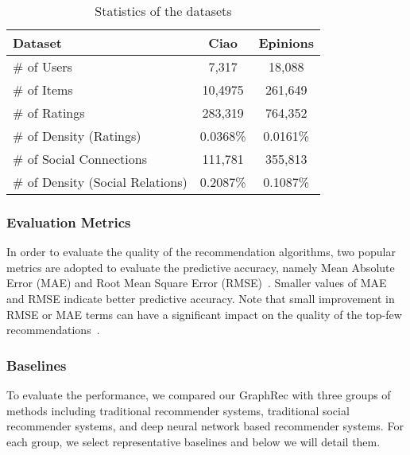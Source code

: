 \documentclass[sigconf]{acmart} \copyrightyear{2019}
\begin{document}
\begin{table}[htbp]
\centering
\caption{Statistics of the datasets}
\label{tab:dataset}
\begin{tabular}{l|c|c}
\hline
Dataset               & Ciao  &Epinions \\ \hline
\# of Users           & 7,317   &18,088 \\ \hline
\# of Items           & 10,4975  &261,649 \\ \hline
\# of Ratings          & 283,319  &764,352\\ \hline \# of Density (Ratings)          & 0.0368\% &0.0161\%  \\ \hline \hline
\# of Social Connections & 111,781 &355,813 \\ \hline
\# of Density (Social Relations)  & 0.2087\% &0.1087\% \\ \hline \end{tabular}
\vskip -0.1in
\end{table}


\subsubsection{Evaluation Metrics}
In order to evaluate the quality of the recommendation algorithms, two popular metrics are adopted to evaluate the predictive accuracy, namely Mean Absolute Error (MAE) and Root Mean Square Error (RMSE)~\cite{wang2018exploring}. Smaller values of MAE and RMSE indicate better predictive accuracy. Note that small improvement in RMSE or MAE terms can have a significant impact on the quality of the top-few recommendations~\cite{koren2008factorization}.

\subsubsection{Baselines}

To evaluate the performance, we compared our GraphRec with three groups of methods including traditional recommender systems, traditional social recommender systems, and deep neural network based recommender systems. For each group, we select representative baselines and below we will detail them.
\end{document}
